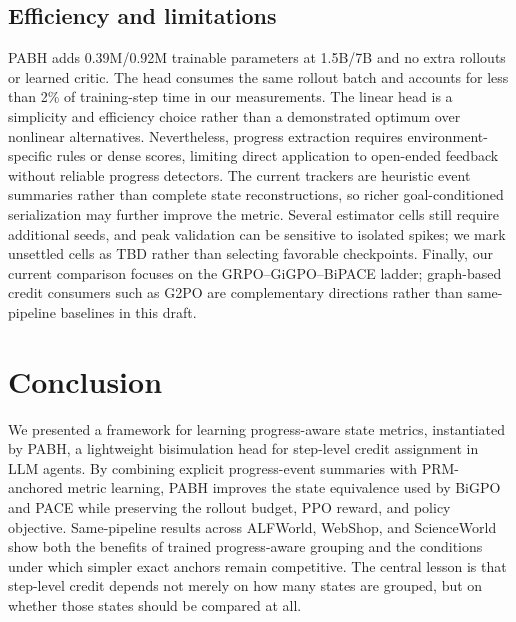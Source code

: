 \documentclass[10pt,twocolumn,letterpaper]{article}
\newcommand{\method}{PABH\xspace}
\newcommand{\TBD}{\textcolor{red!60!black}{TBD}}
\begin{document}
\subsection{Efficiency and limitations}
\method adds 0.39M/0.92M trainable parameters at 1.5B/7B and no extra rollouts or learned critic. The head consumes the same rollout batch and accounts for less than 2\% of training-step time in our measurements. The linear head is a simplicity and efficiency choice rather than a demonstrated optimum over nonlinear alternatives. Nevertheless, progress extraction requires environment-specific rules or dense scores, limiting direct application to open-ended feedback without reliable progress detectors. The current trackers are heuristic event summaries rather than complete state reconstructions, so richer goal-conditioned serialization may further improve the metric. Several estimator cells still require additional seeds, and peak validation can be sensitive to isolated spikes; we mark unsettled cells as \TBD{} rather than selecting favorable checkpoints. Finally, our current comparison focuses on the GRPO--GiGPO--BiPACE ladder; graph-based credit consumers such as G2PO are complementary directions rather than same-pipeline baselines in this draft.

\section{Conclusion}
We presented a framework for learning progress-aware state metrics, instantiated by \method, a lightweight bisimulation head for step-level credit assignment in LLM agents. By combining explicit progress-event summaries with PRM-anchored metric learning, \method improves the state equivalence used by BiGPO and PACE while preserving the rollout budget, PPO reward, and policy objective. Same-pipeline results across ALFWorld, WebShop, and ScienceWorld show both the benefits of trained progress-aware grouping and the conditions under which simpler exact anchors remain competitive. The central lesson is that step-level credit depends not merely on how many states are grouped, but on whether those states should be compared at all.

{\small


}

\appendix

\end{document}
